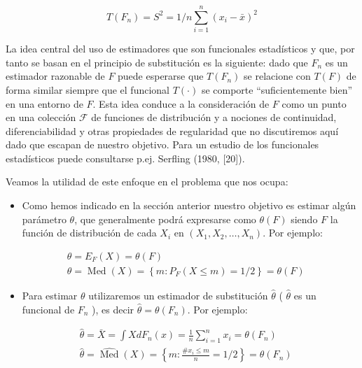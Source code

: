 \documentclass[
]{article}
\providecommand{\tightlist}{%
  \setlength{\itemsep}{0pt}\setlength{\parskip}{0pt}}
\begin{document}
\[
T\left(F_{n}\right)=S^{2}=1 / n \sum_{i=1}^{n}\left(x_{i}-\bar{x}\right)^{2}
\]

La idea central del uso de estimadores que son funcionales estadísticos y que, por tanto se basan en el principio de substitución es la siguiente: dado que \(F_{n}\) es un estimador razonable de \(F\) puede esperarse que \(T\left(F_{n}\right)\) se relacione con \(T(F)\) de forma similar siempre que el funcional \(T(\cdot)\) se comporte ``suficientemente bien'' en una entorno de \(F\). Esta idea conduce a la consideración de \(F\) como un punto en una colección \(\mathcal{F}\) de funciones de distribución y a nociones de continuidad, diferenciabilidad y otras propiedades de regularidad que no discutiremos aquí dado que escapan de nuestro objetivo. Para un estudio de los funcionales estadísticos puede consultarse p.ej. Serfling (1980, {[}20{]}).

Veamos la utilidad de este enfoque en el problema que nos ocupa:

\begin{itemize}
\tightlist
\item
  Como hemos indicado en la sección anterior nuestro objetivo es estimar algún parámetro \(\theta\), que generalmente podrá expresarse como \(\theta(F)\) siendo \(F\) la función de distribución de cada \(X_{i}\) en \(\left(X_{1}, X_{2}, \ldots, X_{n}\right)\). Por ejemplo:
\end{itemize}

\[
\begin{aligned}
& \theta=E_{F}(X)=\theta(F) \\
& \theta=\operatorname{Med}(X)=\left\{m: P_{F}(X \leq m)=1 / 2\right\}=\theta(F)
\end{aligned}
\]

\begin{itemize}
\tightlist
\item
  Para estimar \(\theta\) utilizaremos un estimador de substitución \(\hat{\theta}\) ( \(\hat{\theta}\) es un funcional de \(F_{n}\) ), es decir \(\hat{\theta}=\theta\left(F_{n}\right)\). Por ejemplo:
\end{itemize}

\[
\begin{aligned}
& \hat{\theta}=\bar{X}=\int X d F_{n}(x)=\frac{1}{n} \sum_{i=1}^{n} x_{i}=\theta\left(F_{n}\right) \\
& \hat{\theta}=\widehat{\operatorname{Med}}(X)=\left\{m: \frac{\# x_{i} \leq m}{n}=1 / 2\right\}=\theta\left(F_{n}\right)
\end{aligned}
\]
\end{document}
